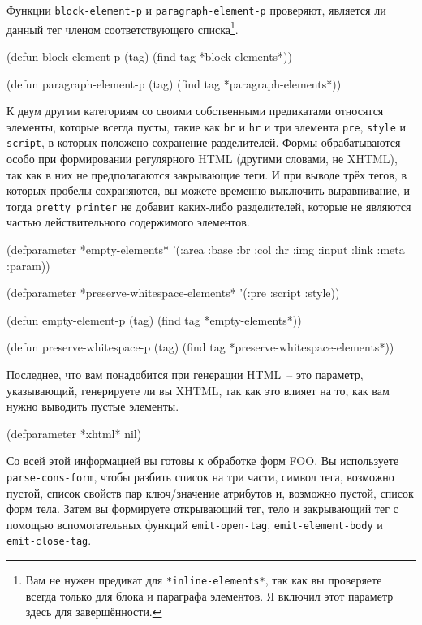 Функции \lstinline{block-element-p} и \lstinline{paragraph-element-p} проверяют, является ли данный
тег членом соответствующего списка\footnote{Вам не нужен предикат для
  \lstinline{*inline-elements*}, так как вы проверяете всегда только для блока и параграфа
  элементов. Я включил этот параметр здесь для завершённости.}.

\begin{myverb}
(defun block-element-p (tag) (find tag *block-elements*))

(defun paragraph-element-p (tag) (find tag *paragraph-elements*))
\end{myverb}

К двум другим категориям со своими собственными предикатами относятся элементы, которые
всегда пусты, такие как \lstinline{br} и \lstinline{hr} и три элемента \lstinline{pre}, \lstinline{style} и
\lstinline{script}, в которых положено сохранение разделителей. Формы обрабатываются особо при
формировании регулярного HTML (другими словами, не XHTML), так как в них не предполагаются
закрывающие теги. И при выводе трёх тегов, в которых пробелы сохраняются, вы можете
временно выключить выравнивание, и тогда \lstinline{pretty printer} не добавит каких-либо
разделителей, которые не являются частью действительного содержимого элементов.

\begin{myverb}
(defparameter *empty-elements*
  '(:area :base :br :col :hr :img :input :link :meta :param))

(defparameter *preserve-whitespace-elements* '(:pre :script :style))

(defun empty-element-p (tag) (find tag *empty-elements*))

(defun preserve-whitespace-p (tag) (find tag *preserve-whitespace-elements*))
\end{myverb}

Последнее, что вам понадобится при генерации HTML~-- это параметр, указывающий, генерируете
ли вы XHTML, так как это влияет на то, как вам нужно выводить пустые элементы.

\begin{myverb}
(defparameter *xhtml* nil)
\end{myverb}

Со всей этой информацией вы готовы к обработке форм FOO. Вы используете
\lstinline{parse-cons-form}, чтобы разбить список на три части, символ тега, возможно пустой,
список свойств пар ключ/значение атрибутов и, возможно пустой, список форм тела. Затем вы
формируете открывающий тег, тело и закрывающий тег с помощью вспомогательных функций
\lstinline{emit-open-tag}, \lstinline{emit-element-body} и \lstinline{emit-close-tag}.

